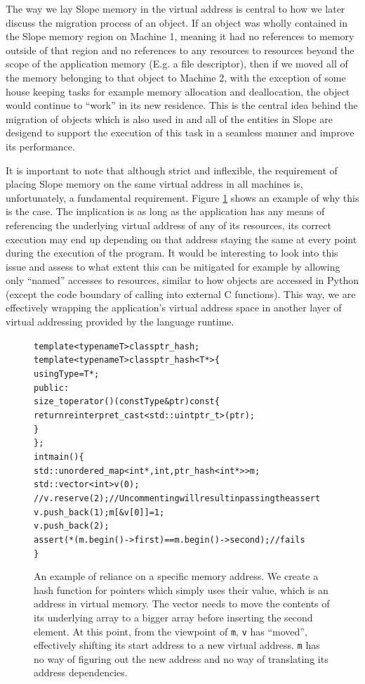 The way we lay Slope memory in the virtual address is central to how we later
discuss the migration process of an object. If an object was wholly contained
in the Slope memory region on Machine 1, meaning it had no references to memory
outside
of that region and no references to any resources to resources beyond the
scope of the application memory (E.g. a file descriptor), then if we moved all
of the memory belonging to that object to Machine 2, with the exception of
some house keeping tasks for example memory allocation and deallocation, the
object would continue to ``work'' in its new residence. This is the central
idea behind the migration of objects which is also used in \cite{memon2018ramp}
and all of the entities in Slope are desigend
to support the execution of this task in a seamless manner and improve its
performance.

It is important to note that although strict and inflexible, the requirement of
placing Slope memory on the same virtual address in all machines is,
unfortunately, a fundamental requirement. Figure \ref{localmemorymanagementfundamental}
shows an example of why this is the case. The implication is as long as the
application has any means of referencing the underlying virtual address of any
of its resources, its correct execution may end up depending on that address
staying the same at every point during the execution of the program. It would
be interesting to look into this issue and assess to what extent this can be
mitigated for example by allowing only ``named'' accesses to resources, similar
to how objects are accessed in Python (except the code boundary of calling into
external C functions). This way, we are effectively wrapping the application's
virtual address space in another layer of virtual addressing provided by the
language runtime.


\begin{figure}
\begin{alltt}

template<typename T> class ptr_hash;
template<typename T> class ptr_hash<T*> \{
  using Type = T*;
 public:
  size_t operator()(const Type& ptr) const \{
    return reinterpret_cast<std::uintptr_t>(ptr);
  \}
\};
int main() \{
  std::unordered_map<int*, int, ptr_hash<int*>> m;
  std::vector<int> v(0);
  // v.reserve(2); // Uncommenting will result in passing the assert
  v.push_back(1); m[&v[0]] = 1;
  v.push_back(2);
  assert(*(m.begin()->first) == m.begin()->second); // fails
\}

\end{alltt}
\caption{
    An example of reliance on a specific memory address. We create a hash
    function for pointers which simply uses their value, which is an address
    in virtual memory. The vector needs to move the contents of its underlying array to a
    bigger array before inserting the second element. At this point, from the viewpoint of
    \texttt{m}, \texttt{v} has ``moved'', effectively shifting its start
    address to a new virtual address. \texttt{m} has no way of figuring out
    the new address and no way of translating its address dependencies.
}
\label{localmemorymanagementfundamental}
\end{figure}


